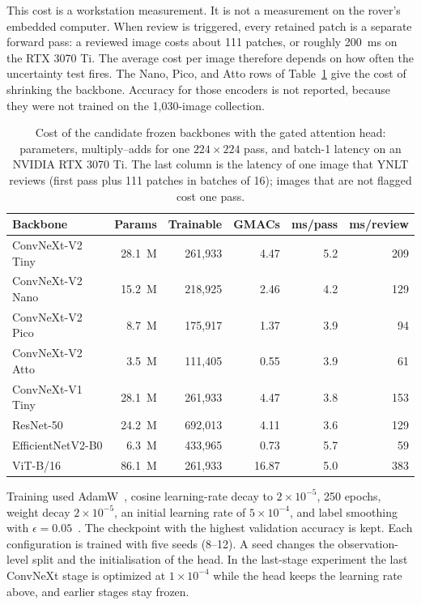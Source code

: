 \documentclass[final,3p,times,twocolumn]{elsarticle}
\begin{document}
This cost is a workstation measurement. It is not a measurement on the rover's embedded computer. When review is triggered, every retained patch is a separate forward pass: a reviewed image costs about 111 patches, or roughly 200~ms on the RTX 3070 Ti. The average cost per image therefore depends on how often the uncertainty test fires. The Nano, Pico, and Atto rows of Table~\ref{tab:cost} give the cost of shrinking the backbone. Accuracy for those encoders is not reported, because they were not trained on the 1{,}030-image collection.

\begin{table}[!t]
    \centering
    \caption{Cost of the candidate frozen backbones with the gated attention head: parameters, multiply--adds for one $224\times 224$ pass, and batch-1 latency on an NVIDIA RTX 3070 Ti. The last column is the latency of one image that YNLT reviews (first pass plus 111 patches in batches of 16); images that are not flagged cost one pass.}
    \label{tab:cost}
    \renewcommand{\arraystretch}{1.15}
    \setlength{\tabcolsep}{5pt}
    \small
    \begin{tabular}{@{}lrrrrr@{}}
        \hline
        \textbf{Backbone} & \textbf{Params} & \textbf{Trainable} & \textbf{GMACs} & \textbf{ms/pass} & \textbf{ms/review} \\
        \hline
        ConvNeXt-V2 Tiny & 28.1~M & 261{,}933 & 4.47 & 5.2 & 209 \\
        ConvNeXt-V2 Nano & 15.2~M & 218{,}925 & 2.46 & 4.2 & 129 \\
        ConvNeXt-V2 Pico & 8.7~M & 175{,}917 & 1.37 & 3.9 & 94 \\
        ConvNeXt-V2 Atto & 3.5~M & 111{,}405 & 0.55 & 3.9 & 61 \\
        ConvNeXt-V1 Tiny & 28.1~M & 261{,}933 & 4.47 & 3.8 & 153 \\
        ResNet-50 & 24.2~M & 692{,}013 & 4.11 & 3.6 & 129 \\
        EfficientNetV2-B0 & 6.3~M & 433{,}965 & 0.73 & 5.7 & 59 \\
        ViT-B/16 & 86.1~M & 261{,}933 & 16.87 & 5.0 & 383 \\
        \hline
    \end{tabular}
\end{table}

Training used AdamW~\cite{loshchilov2019adamw}, cosine learning-rate decay to \(2\times 10^{-5}\), 250 epochs, weight decay \(2\times 10^{-5}\), an initial learning rate of \(5\times 10^{-4}\), and label smoothing with \(\epsilon=0.05\)~\cite{szegedy2016rethinking, Mulleretal2019}. The checkpoint with the highest validation accuracy is kept. Each configuration is trained with five seeds (8--12). A seed changes the observation-level split and the initialisation of the head. In the last-stage experiment the last ConvNeXt stage is optimized at \(1\times 10^{-4}\) while the head keeps the learning rate above, and earlier stages stay frozen.
\end{document}
